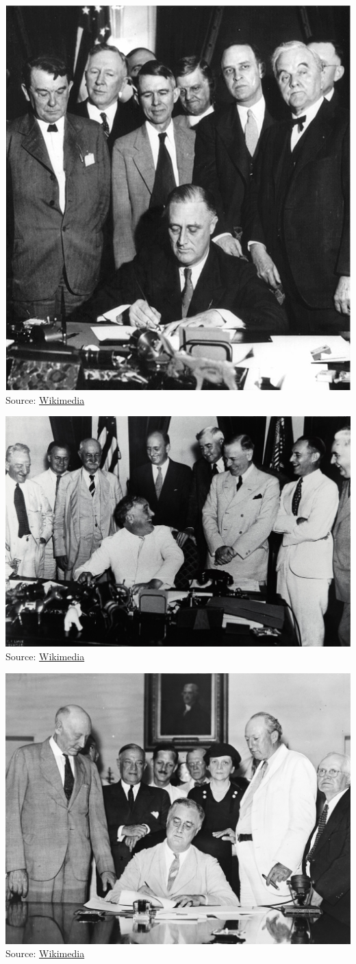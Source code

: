 \documentclass{beamer}
\begin{document}
\begin{frame}
\includegraphics[width = .7\textwidth]{figures/fdr_tva}\\
Source: \href{https://commons.wikimedia.org/wiki/File:Roosevelt_signing_TVA_Act_(1933).jpg}{Wikimedia}
\end{frame}

\begin{frame}
\includegraphics[width = .7\textwidth]{figures/fdr_banking}\\
Source: \href{https://commons.wikimedia.org/wiki/File:Franklin_Delano_Roosevelt_signs_Banking_Act_of_1935.jpg}{Wikimedia}
\end{frame}

\begin{frame}
\includegraphics[width = .7\textwidth]{figures/fdr_ssa}\\
Source: \href{https://commons.wikimedia.org/wiki/File:Signing_Of_The_Social_Security_Act.jpg}{Wikimedia}
\end{frame}
\end{document}
